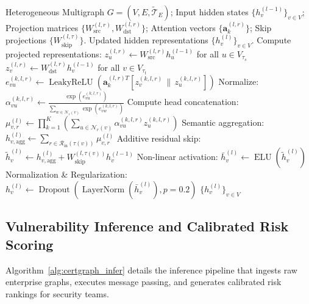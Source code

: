 \begin{algorithm}[ht]
\caption{CertGraph Heterogeneous Attention Layer Forward Pass}
\label{alg:certgraph_layer}
\begin{algorithmic}[1]
\Require Heterogeneous Multigraph $G = (V, E, \tilde{\mathcal{T}}_E)$; Input hidden states $\{h_v^{(l-1)}\}_{v \in V}$; Projection matrices $\{W_{\text{src}}^{(l, r)}, W_{\text{dst}}^{(l, r)}\}$; Attention vectors $\{\mathbf{a}_k^{(l, r)}\}$; Skip projections $\{W_{\text{skip}}^{(l, \tau)}\}$.
\Ensure Updated hidden representations $\{h_v^{(l)}\}_{v \in V}$.
    \State Compute projected representations:
    \State \quad $z_u^{(l, r)} \gets W_{\text{src}}^{(l, r)} h_u^{(l-1)}$ for all $u \in V_{\tau_s}$
    \State \quad $z_v^{(l, r)} \gets W_{\text{dst}}^{(l, r)} h_v^{(l-1)}$ for all $v \in V_{\tau_t}$
            \State $e_{vu}^{(k, l, r)} \gets \operatorname{LeakyReLU} \left( \mathbf{a}_k^{(l, r) T} [z_v^{(k, l, r)} \,\|\, z_u^{(k, l, r)}] \right)$
        \EndFor
            \State Normalize: $\alpha_{vu}^{(k, l, r)} \gets \frac{\exp(e_{vu}^{(k, l, r)})}{\sum_{w \in \mathcal{N}_r(v)} \exp(e_{vw}^{(k, l, r)})}$
        \EndFor
    \EndFor
        \State Compute head concatenation: $\mu_{v, r}^{(l)} \gets \prod_{k=1}^K \left( \sum_{u \in \mathcal{N}_r(v)} \alpha_{vu}^{(k, l, r)} z_u^{(k, l, r)} \right)$
    \EndFor
\EndFor
{}
    \State Semantic aggregation: $h_{v, \text{agg}}^{(l)} \gets \sum_{r \in \mathcal{R}_{\text{in}}(\tau(v))} \mu_{v, r}^{(l)}$
    \State Additive residual skip: $\tilde{h}_v^{(l)} \gets h_{v, \text{agg}}^{(l)} + W_{\text{skip}}^{(l, \tau(v))} h_v^{(l-1)}$
    \State Non-linear activation: $\bar{h}_v^{(l)} \gets \operatorname{ELU}(\tilde{h}_v^{(l)})$
    \State Normalization \& Regularization: $h_v^{(l)} \gets \operatorname{Dropout}(\operatorname{LayerNorm}(\bar{h}_v^{(l)}), p = 0.2)$
\EndFor
\State \Return $\{h_v^{(l)}\}_{v \in V}$
\end{algorithmic}
\end{algorithm}

\subsection{Vulnerability Inference and Calibrated Risk Scoring}
Algorithm~\ref{alg:certgraph_infer} details the inference pipeline that ingests raw enterprise graphs, executes message passing, and generates calibrated risk rankings for security teams.

